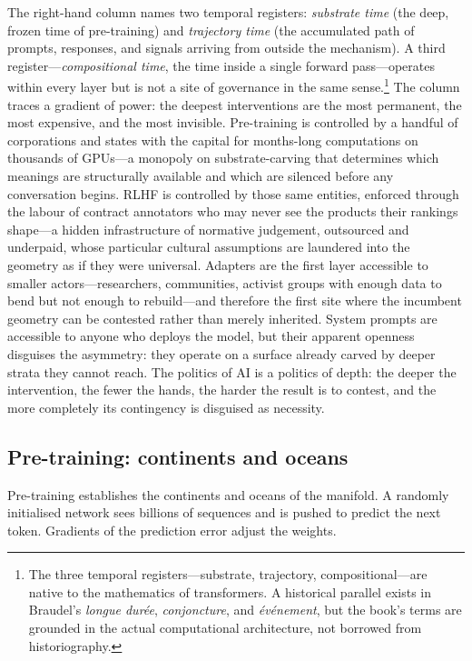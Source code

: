 The right-hand column names two temporal registers: \emph{substrate time} (the deep, frozen time of pre-training) and \emph{trajectory time} (the accumulated path of prompts, responses, and signals arriving from outside the mechanism). A third register---\emph{compositional time}, the time inside a single forward pass---operates within every layer but is not a site of governance in the same sense.\footnote{The three temporal registers---substrate, trajectory, compositional---are native to the mathematics of transformers. A historical parallel exists in Braudel's \emph{longue dur\'ee}, \emph{conjoncture}, and \emph{\'ev\'enement}, but the book's terms are grounded in the actual computational architecture, not borrowed from historiography.} The column traces a gradient of power: the deepest interventions are the most permanent, the most expensive, and the most invisible. Pre-training is controlled by a handful of corporations and states with the capital for months-long computations on thousands of GPUs---a monopoly on substrate-carving that determines which meanings are structurally available and which are silenced before any conversation begins. RLHF is controlled by those same entities, enforced through the labour of contract annotators who may never see the products their rankings shape---a hidden infrastructure of normative judgement, outsourced and underpaid, whose particular cultural assumptions are laundered into the geometry as if they were universal. Adapters are the first layer accessible to smaller actors---researchers, communities, activist groups with enough data to bend but not enough to rebuild---and therefore the first site where the incumbent geometry can be contested rather than merely inherited. System prompts are accessible to anyone who deploys the model, but their apparent openness disguises the asymmetry: they operate on a surface already carved by deeper strata they cannot reach. The politics of AI is a politics of depth: the deeper the intervention, the fewer the hands, the harder the result is to contest, and the more completely its contingency is disguised as necessity.

\subsection{Pre-training: continents and oceans}

Pre-training establishes the continents and oceans of the manifold. A randomly initialised network sees billions of sequences and is pushed to predict the next token. Gradients of the prediction error adjust the weights.

